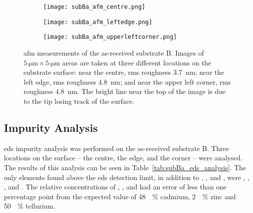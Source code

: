 \begin{figure}[htbp]
    \centering
    \begin{subfigure}[t]{0.3\linewidth}
    \centering
        \texttt{[image: subBa\_afm\_centre.png]}
        \caption{}\label{fig:subBa_afm_centre}
    \end{subfigure}
    \hfill
    \begin{subfigure}[t]{0.3\linewidth}
    \centering
        \texttt{[image: subBa\_afm\_leftedge.png]}
        \caption{}\label{fig:subBa_afm_edge}
    \end{subfigure}
    \hfill
    \begin{subfigure}[t]{0.3\linewidth}
    \centering
        \texttt{[image: subBa\_afm\_upperleftcorner.png]}
        \caption{}\label{fig:subBa_afm_corner}
    \end{subfigure}
    \caption[\Ac{afm} of as-received substrate B.]{\Acf{afm} measurements of the as-received substrate B. Images of $\SI{5}{\micro\metre}\times\SI{5}{\micro\metre}$ areas are taken at three different locations on the substrate surface:  near the centre, \ac{rms} roughness \SI{3,7}{\nano\metre};  near the left edge, \ac{rms} roughness \SI{4,8}{\nano\metre}; and  near the upper left corner, \ac{rms} roughness \SI{4,8}{\nano\metre}. The bright line near the top of the image is due to the tip losing track of the surface.}\label{fig:subBa_afm}
\end{figure} %


\subsection{Impurity Analysis}

\Ac{eds} impurity analysis was performed on the as-received substrate B. Three locations on the surface -- the centre, the edge, and the corner -- were analysed. The results of this analysis can be seen in Table~\ref{tab:subBa_eds_analysis}. The only elements found above the \ac{eds} detection limit, in addition to , , and , were , , , and . The relative concentrations of , , and  had an error of less than one percentage point from the expected value of \SI{48}{\atomic\percent} cadmium, \SI{2}{\atomic\percent} zinc and \SI{50}{\atomic\percent} tellurium.

